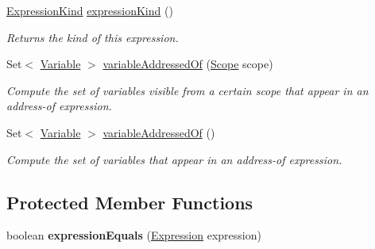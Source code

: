 \begin{DoxyCompactItemize}
\item 
\hyperlink{enumedu_1_1udel_1_1cis_1_1vsl_1_1civl_1_1model_1_1IF_1_1expression_1_1Expression_1_1ExpressionKind}{Expression\+Kind} \hyperlink{classedu_1_1udel_1_1cis_1_1vsl_1_1civl_1_1model_1_1common_1_1expression_1_1CommonUndefinedProcessExpression_aa6bfa653c65d800e81ea18c554eedb29}{expression\+Kind} ()
\begin{DoxyCompactList}\small\item\em Returns the kind of this expression. \end{DoxyCompactList}\item 
Set$<$ \hyperlink{interfaceedu_1_1udel_1_1cis_1_1vsl_1_1civl_1_1model_1_1IF_1_1variable_1_1Variable}{Variable} $>$ \hyperlink{classedu_1_1udel_1_1cis_1_1vsl_1_1civl_1_1model_1_1common_1_1expression_1_1CommonUndefinedProcessExpression_a9a09805177e3c51980a9ddfe3dc5f910}{variable\+Addressed\+Of} (\hyperlink{interfaceedu_1_1udel_1_1cis_1_1vsl_1_1civl_1_1model_1_1IF_1_1Scope}{Scope} scope)
\begin{DoxyCompactList}\small\item\em Compute the set of variables visible from a certain scope that appear in an address-\/of expression. \end{DoxyCompactList}\item 
Set$<$ \hyperlink{interfaceedu_1_1udel_1_1cis_1_1vsl_1_1civl_1_1model_1_1IF_1_1variable_1_1Variable}{Variable} $>$ \hyperlink{classedu_1_1udel_1_1cis_1_1vsl_1_1civl_1_1model_1_1common_1_1expression_1_1CommonUndefinedProcessExpression_acd49214882e41c4debb13f54fd613032}{variable\+Addressed\+Of} ()
\begin{DoxyCompactList}\small\item\em Compute the set of variables that appear in an address-\/of expression. \end{DoxyCompactList}\end{DoxyCompactItemize}
\subsection*{Protected Member Functions}
\begin{DoxyCompactItemize}
\item 
\hypertarget{classedu_1_1udel_1_1cis_1_1vsl_1_1civl_1_1model_1_1common_1_1expression_1_1CommonUndefinedProcessExpression_a226bb7da45e657d0dc610bc58d16e77c}{}boolean {\bfseries expression\+Equals} (\hyperlink{interfaceedu_1_1udel_1_1cis_1_1vsl_1_1civl_1_1model_1_1IF_1_1expression_1_1Expression}{Expression} expression)\label{classedu_1_1udel_1_1cis_1_1vsl_1_1civl_1_1model_1_1common_1_1expression_1_1CommonUndefinedProcessExpression_a226bb7da45e657d0dc610bc58d16e77c}

\end{DoxyCompactItemize}
